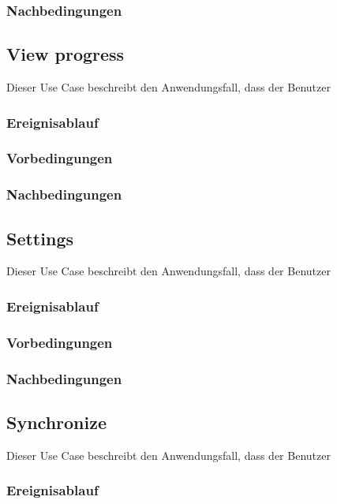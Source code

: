 		\subsubsection{Nachbedingungen}
	
	\subsection{View progress}
		Dieser Use Case beschreibt den Anwendungsfall, dass der Benutzer 
			
		\subsubsection{Ereignisablauf}
	
		\subsubsection{Vorbedingungen}
			
		\subsubsection{Nachbedingungen}
	
	\subsection{Settings}
		Dieser Use Case beschreibt den Anwendungsfall, dass der Benutzer 
			
		\subsubsection{Ereignisablauf}
	
		\subsubsection{Vorbedingungen}
			
		\subsubsection{Nachbedingungen}
	
	\subsection{Synchronize}
		Dieser Use Case beschreibt den Anwendungsfall, dass der Benutzer 
			
		\subsubsection{Ereignisablauf}
			
